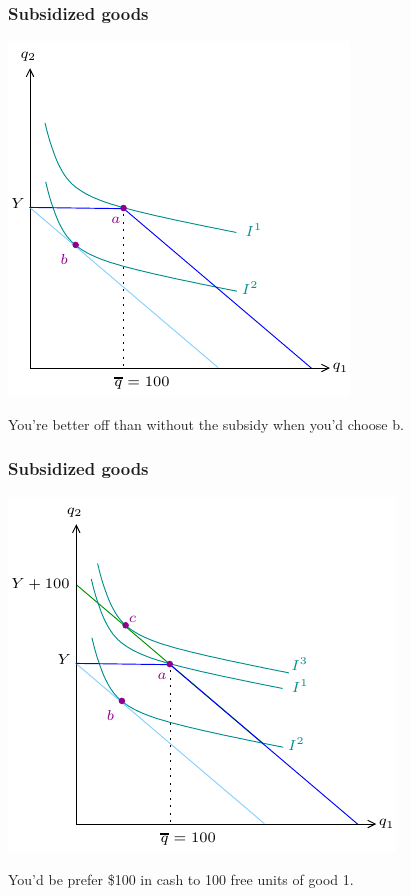 \documentclass[xcolor=pdftex,dvipsnames]{beamer}
\begin{document}
\begin{frame}
\frametitle{Subsidized goods}
\begin{center}
\includegraphics{pics/Subsidy5}
\end{center}
You're better off than without the subsidy when you'd choose b.
\end{frame}

\begin{frame}
\frametitle{Subsidized goods}
\begin{center}
\includegraphics{pics/Subsidy6}
\end{center}
You'd be prefer \$100 in cash to 100 free units of good 1.
\end{frame}
\end{document}
